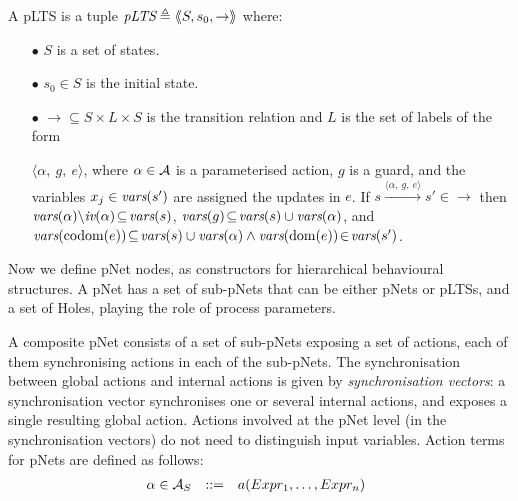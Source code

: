 \documentclass{llncs}
\newcommand{\Ludo}{\\\hfill\mdash Ludo}
\newcommand{\noteLH}[2][color=orange!40, size=\tiny]{\todo[#1]{{#2}\Ludo}}
\newcommand{\mdash}[1][]{---#1}
\begin{document}
\begin{definition}[pLTS]
\label{pLTS}
A pLTS is a tuple
$\pLTS\triangleq\mylangle S,s_0, \to\myrangle$ where:
\begin{itemize}
\item[$\bullet$]
$S$ is a set of states.
\item[$\bullet$]
$s_0 \in S$ is the initial state.
\item[$\bullet$] $\to \subseteq S \times L \times S$ is the transition relation and 
$L$ is the set of labels of the form

$\langle \alpha,~g,~e\rangle$,
where $\alpha \in\mathcal{A}$ is a parameterised action, $g$ is a guard, and the variables 
$x_j\in \vars(s')$
are assigned the updates in $e$.
If 
$s \xrightarrow{\langle \alpha,~g,~e\rangle} s'\in \to $ then 
		$\vars(\alpha)\backslash \iv(\alpha)\!\subseteq\! \vars(s)$, 
		$\vars(g)\!\subseteq\! \vars(s)\cup\vars(\alpha)$, and
		$\vars(\codom(e))\!\subseteq\! \vars(s)\cup\vars(\alpha)\land 
		\vars(\dom(e))\!\in\!\vars(s')$. %
		
\end{itemize}
\end{definition}
\noteLH{is dom and codom clear?}
Now we define
pNet nodes, as constructors for hierarchical behavioural structures.
A pNet has a set of sub-pNets that can be either pNets or pLTSs, and a
set of Holes, playing the role of process parameters.

A composite pNet consists of a set of sub-pNets exposing
a set of actions, each of them synchronising actions in each of
the sub-pNets. The synchronisation between global actions and
internal actions is given by  \emph{synchronisation vectors}: a
synchronisation vector synchronises one or several internal actions, and
exposes a single resulting global action.
Actions involved at the pNet level (in the synchronisation vectors) do
not need to distinguish  input 
variables. Action terms for pNets are defined as follows:
\[\begin{array}[l]{rcl@{\quad}l}
  \alpha\in \AlgAS &::=&a(Expr_1,\ldots,Expr_n)
\end{array}
\]
\end{document}
